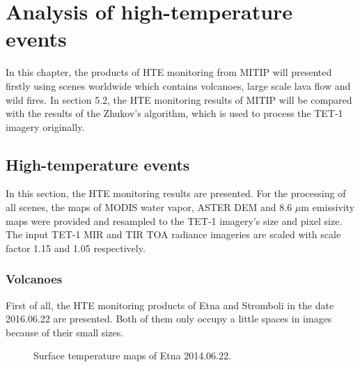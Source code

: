 \chapter{Analysis of high-temperature events}

\label{Chapter5}

In this chapter, the products of HTE monitoring from MITIP will presented firstly using scenes worldwide which contains volcanoes, large scale lava flow and wild fires. In section 5.2, the HTE monitoring results of MITIP will be compared with the results of the Zhukov's algorithm, which is used to process the TET-1 imagery originally.\\

\section{High-temperature events}
In this section, the HTE monitoring results are presented. For the processing of all scenes, the maps of MODIS water vapor, ASTER DEM and 8.6 $\mu$m emissivity maps were provided and resampled to the TET-1 imagery's size and pixel size. The input TET-1 MIR and TIR TOA radiance imageries are scaled with scale factor 1.15 and 1.05 respectively.\\


\subsection{Volcanoes}
First of all, the HTE monitoring products of Etna and Stromboli in the date 2016.06.22 are presented. Both of them only occupy a little spaces in images because of their small sizes.\\

\begin{figure}[!htbp]
\centering
{}
\hspace{0.1in}
\caption{Surface temperature maps of Etna 2014.06.22.}
\label{fig:Etna_sur_tem}
\end{figure}

